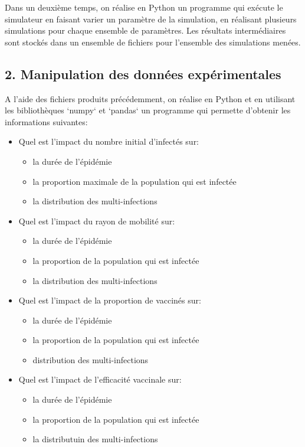 \documentclass[a4paper, 11pt]{article}
\begin{document}
			Dans un deuxième temps, on réalise en Python un programme qui exécute le simulateur en faisant varier un paramètre de la simulation, en réalisant plusieurs simulations pour chaque ensemble de paramètres. Les résultats intermédiaires sont stockés dans un ensemble de fichiers pour l'ensemble des simulations menées.


		\subsection{2. Manipulation des données expérimentales}

			A l'aide des fichiers produits précédemment, on réalise en Python et en utilisant les bibliothèques `numpy` et `pandas` un programme qui permette d'obtenir les informations suivantes:
			\begin{itemize}
				\item Quel est l'impact du nombre initial d'infectés sur:
				\begin{itemize}
					\item la durée de l'épidémie
					\item la proportion maximale de la population qui est infectée
					\item la distribution des multi-infections
				\end{itemize}
				
				\item Quel est l'impact du rayon de mobilité sur:
				\begin{itemize}
					\item la durée de l'épidémie
					\item la proportion de la population qui est infectée
					\item la distribution des multi-infections
				\end{itemize}
				
				\item Quel est l'impact de la proportion de vaccinés sur:
				\begin{itemize}
					\item la durée de l'épidémie
					\item la proportion de la population qui est infectée
					\item distribution des multi-infections
				\end{itemize}
				
				\item Quel est l'impact de l'efficacité vaccinale sur:
				\begin{itemize}
					\item la durée de l'épidémie
					\item la proportion de la population qui est infectée
					\item la distributuin des multi-infections
				\end{itemize}
				

\end{itemize}
\end{document}

